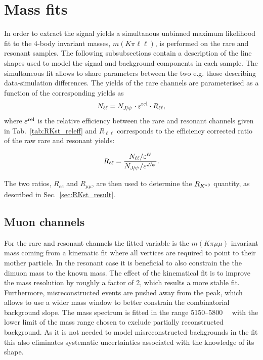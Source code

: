 \section{Mass fits}
\label{sec:rkst_fits}

In order to extract the signal yields a simultanous unbinned maximum likelihood fit
to the 4-body invariant masses, $m(K\pi\ell\ell)$, is performed on the rare and resonant samples.
The following subsubsections contain a description of the line shapes used to model
the signal and background components in each sample.
The simultaneous fit allows to share parameters between the two e.g. those describing data-simulation differences.
The yields of the rare channels are parameterised as a function of the corresponding \jpsi yields as
%
\begin{equation}
N_{\ell\ell} = N_{\jpsi} \cdot \varepsilon^{\rm rel} \cdot R_{\ell\ell},
\end{equation}
%
where $\varepsilon^{\rm rel}$ is the relative efficiency between the rare and resonant channels
given in Tab.~\ref{tab:RKst_releff} and
$R_{\ell\ell}$ corresponds to the efficiency corrected ratio of the raw rare and resonant yields:

\begin{equation}
R_{\ell\ell} = \frac{N_{\ell\ell} / \varepsilon^{\ell\ell}}{N_{\jpsi} / \varepsilon^{\jpsi}}.
\end{equation}

The two ratios, $R_{ee}$ and $R_{\mu\mu}$, are then used to determine
the $R_{{{K}^{*0}}}$ quantity, as described in Sec.~\ref{sec:RKst_result}.


\subsection{Muon channels}

For the rare and resonant \mumu channels the fitted variable is the $m(K\pi \mu\mu)$ invariant mass coming
from a kinematic fit where all vertices are required to point to their mother particle.
In the resonant case it is beneficial to also constrain the the dimuon mass to the known \jpsi mass.
The effect of the kinematical fit is to improve the mass resolution by roughly a factor of 2, which results
a more stable fit. Furthermore, misreconstructed events are pushed away from the \Bz peak, which allows to
use a wider mass window to better constrain the combinatorial background slope.
The mass spectrum is fitted in the range 5150--5800~\mevcc~ with the lower limit
of the mass range chosen to exclude partially reconstructed background.
As it is not needed to model misreconstructed backgrounds in the fit this also
eliminates systematic uncertainties associated with the knowledge of its shape. 

